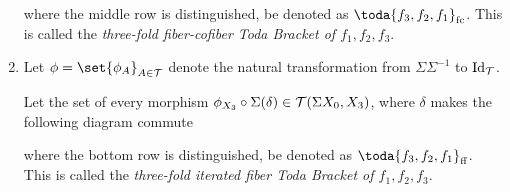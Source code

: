 \begin{definition}
\begin{enumerate}
{\begin{center}
            \end{center}
            where the middle row is distinguished, be denoted as \( \toda{f_3, f_2, f_1}_{\fc} \). This is called the \emph{three-fold fiber-cofiber Toda Bracket of \( f_1, f_2, f_3 \)}.
        }
        \item {
            Let \( \phi = \set{\phi_A}_{A \in \Tc} \) denote the natural transformation from \( \Sigma \Sigma^{-1} \) to \( \operatorname{Id}_{{\mathcal{T}}} \).

            Let the set of every morphism \( \phi_{X_3} \circ \Sigma(\delta) \in {\mathcal{T}}(\Sigma X_0, X_3) \), where \( \delta \) makes the following diagram commute
            \begin{center}
            \end{center}
            where the bottom row is distinguished, be denoted as \( \toda{f_3, f_2, f_1}_{\ff} \). This is called the \emph{three-fold iterated fiber Toda Bracket of \( f_1, f_2, f_3 \)}.
        }
    \end{enumerate}
\end{definition}

